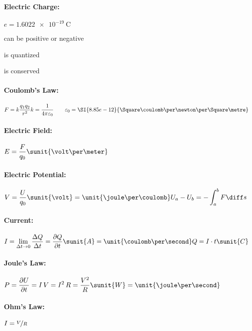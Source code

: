 
\paragraph{Electric Charge:} %
	$
		e = \SI{1.6022e-19}{\coulomb}
	$
	\vspace{-2mm}
	\begin{tightitemize}
		\item can be positive or negative
		\item is quantized
		\item is conserved
	\end{tightitemize}

\paragraph{Coulomb's Law:} %
	$\displaystyle
		F = k \frac{q_1 q_2}{r^2} \\
		k = \frac{1}{4 \pi \varepsilon_0} \qquad
		\varepsilon_0 = \SI{8.85e-12}{\Square\coulomb\per\newton\per\Square\metre}
	$

\paragraph{Electric Field:} %
	$\displaystyle
		E = \frac{F}{q_0} \sunit{\volt\per\meter}
	$

\paragraph{Electric Potential:} %
	$\displaystyle
		V = \frac{U}{q_0} \sunit{\volt} = \unit{\joule\per\coulomb} \\
		U_a - U_b = - \int_a^b F \diff s
	$

\paragraph{Current:} %
	$\displaystyle
		I = \lim_{\Delta t \to 0} \frac{\Delta Q}{\Delta t} = \frac{\partial Q}{\partial t} \sunit{A} = \unit{\coulomb\per\second} \\
		Q = I \cdot t \sunit{C}
	$

\paragraph{Joule's Law:} %
	$\displaystyle
		P = \frac{\partial U}{\partial t}
		  = I \, V
		  = I^2 \, R
		  = \frac{V^2}{R}
		\sunit{W} = \unit{\joule\per\second}
	$

\paragraph{Ohm's Law:} %
	$\displaystyle
		I = \nicefrac{V}{R}
	$
